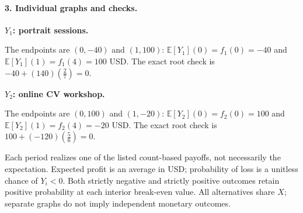 \clearpage\paragraph{3. Individual graphs and checks.}
\textbf{$Y_1$: portrait sessions.}
\begin{center}\end{center}
The endpoints are $(0,-40)$ and $(1,100)$: $\mathbb E[Y_1](0)=f_1(0)=-40$ and
$\mathbb E[Y_1](1)=f_1(4)=100$ USD.
The exact root check is $-40+(140)(\frac{2}{7})=0$.
\par\medskip
\textbf{$Y_2$: online CV workshop.}
\begin{center}\end{center}
The endpoints are $(0,100)$ and $(1,-20)$: $\mathbb E[Y_2](0)=f_2(0)=100$ and
$\mathbb E[Y_2](1)=f_2(4)=-20$ USD.
The exact root check is $100+(-120)(\frac{5}{6})=0$.
\par\medskip
Each period realizes one of the listed count-based payoffs, not necessarily the expectation.
Expected profit is an average in USD; probability of loss is a unitless chance of $Y_i<0$.
Both strictly negative and strictly positive outcomes retain positive probability at each interior break-even value.
All alternatives share $X$; separate graphs do not imply independent monetary outcomes.
\clearpage
